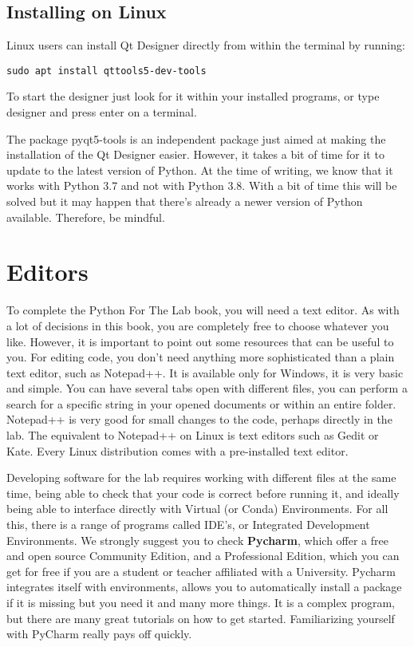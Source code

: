 \subsection{Installing on Linux}
Linux users can install Qt Designer directly from within the terminal by running:

\begin{verbatim}
sudo apt install qttools5-dev-tools
\end{verbatim}

To start the designer just look for it within your installed programs, or type designer and press enter on a terminal. 

The package pyqt5-tools is an independent package just aimed at making the installation of the Qt Designer easier. However, it takes a bit of time for it to update to the latest version of Python. At the time of writing, we know that it works with Python 3.7 and not with Python 3.8. With a bit of time this will be solved but it may happen that there's already a newer version of Python available. Therefore, be mindful. 

\section{Editors}
To complete the Python For The Lab book, you will need a text editor. As with a lot of decisions in this book, you are completely free to choose whatever you like. However, it is important to point out some resources that can be useful to you. For editing code, you don’t need anything more sophisticated than a plain text editor, such as Notepad++. It is available only for Windows, it is very basic and simple. You can have several tabs open with different files, you can perform a search for a specific string in your opened documents or within an entire folder. Notepad++ is very good for small changes to the code, perhaps directly in the lab. The equivalent to Notepad++ on Linux is text editors such as Gedit or Kate. Every Linux distribution comes with a pre-installed text editor. 

Developing software for the lab requires working with different files at the same time, being able to check that your code is correct before running it, and ideally being able to interface directly with Virtual (or Conda) Environments. For all this, there is a range of programs called IDE’s, or Integrated Development Environments. We strongly suggest you to check \textbf{Pycharm}, which offer a free and open source Community Edition, and a Professional Edition, which you can get for free if you are a student or teacher affiliated with a University. Pycharm integrates itself with environments, allows you to automatically install a package if it is missing but you need it and many more things. It is a complex program, but there are many great tutorials on how to get started. Familiarizing yourself with PyCharm really pays off quickly. 

